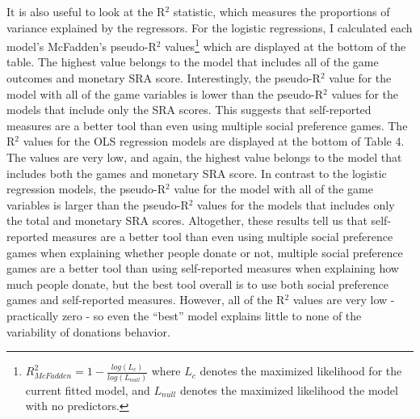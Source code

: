 \documentclass[12pt]{article}
\begin{document}
It is also useful to look at the R$^{2}$ statistic, which measures the proportions of variance explained by the regressors. For the logistic regressions, I calculated each model\rq s McFadden\rq s pseudo-R$^{2}$ values\footnote{
\(R^{2}_{McFadden} = 1 - \frac{log(L_{c})}{log(L_{null})}\)
where \(L_{c}\) denotes the maximized likelihood for the current fitted model, and \(L_{null}\) denotes the maximized likelihood the model with no predictors.
} which are displayed at the bottom of the table. The highest value belongs to the model that includes all of the game outcomes and monetary SRA score. Interestingly, the pseudo-R$^{2}$ value for the model with all of the game variables is lower than the pseudo-R$^{2}$ values for the models that include only the SRA scores. This suggests that self-reported measures are a better tool than even using multiple social preference games. The R$^{2}$ values for the OLS regression models are displayed at the bottom of Table 4. The values are very low, and again, the highest value belongs to the model that includes both the games and monetary SRA score. In contrast to the logistic regression models, the pseudo-R$^{2}$ value for the model with all of the game variables is larger than the pseudo-R$^{2}$ values for the models that includes only the total and monetary SRA scores. Altogether, these results tell us that self-reported measures are a better tool than even using multiple social preference games when explaining whether people donate or not, multiple social preference games are a better tool than using self-reported measures when explaining how much people donate, but the best tool overall is to use both social preference games and self-reported measures. However, all of the R$^{2}$ values are very low - practically zero - so even the ``best'' model explains little to none of the variability of donations behavior.
\end{document}
